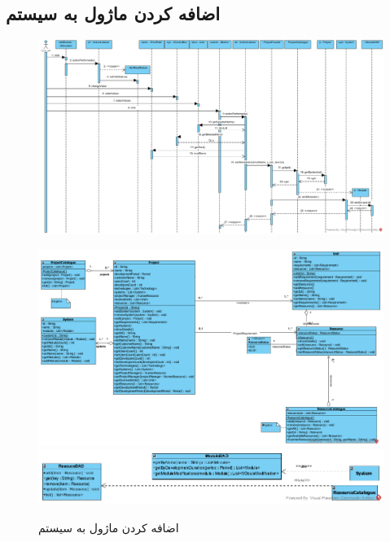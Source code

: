 \begin{landscape}
\section{اضافه کردن ماژول به سیستم}
\begin{figure}[H]
	\centering
	\includegraphics[scale=0.55]{img/sequence-design/AddModuleToSystem}
\end{figure}
\begin{figure}[H]
	\centering
	\includegraphics[scale=0.65]{img/sequence-design/AddModuleToSystemC}
	\includegraphics[scale=0.65]{img/sequence-design/AddModuleToSystemD}
	\caption{اضافه کردن ماژول به سیستم}
\end{figure}

\newpage

\end{landscape}
